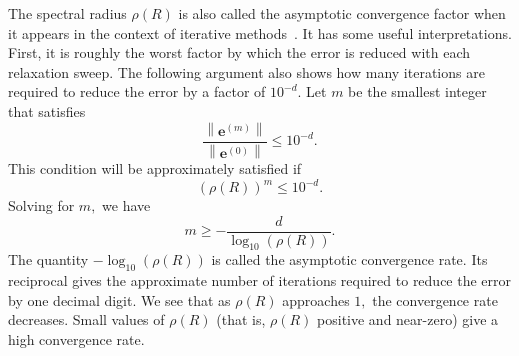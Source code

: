 \documentclass[letterpaper,12pt]{article}
\begin{document}
The spectral radius $\rho(R)$ is also called the asymptotic convergence factor when it appears in the context of iterative methods~\cite{saad2003iterative}. It has some useful interpretations. First, it is roughly the worst factor by which the error is reduced with each relaxation sweep. The following argument also shows how many iterations are required to reduce the error by a factor of $10^{-d}$. Let $m$ be the smallest integer that satisfies
\begin{equation}
\frac{\left\|\mathbf{e}^{(m)}\right\|}{\left\|\mathbf{e}^{(0)}\right\|} \leq 10^{-d}.
\end{equation}
This condition will be approximately satisfied if
\begin{equation}
(\rho(R))^{m} \leq 10^{-d}.
\end{equation}
Solving for $m,$ we have
\begin{equation}
m \geq-\frac{d}{\log _{10}(\rho(R))}.
\end{equation}
The quantity $-\log _{10}(\rho(R))$ is called the asymptotic convergence rate. Its reciprocal gives the approximate number of iterations required to reduce the error by one decimal digit. We see that as $\rho(R)$ approaches $1,$ the convergence rate decreases. Small values of $\rho(R)$ (that is, $\rho(R)$ positive and near-zero) give a high convergence rate.
\end{document}
